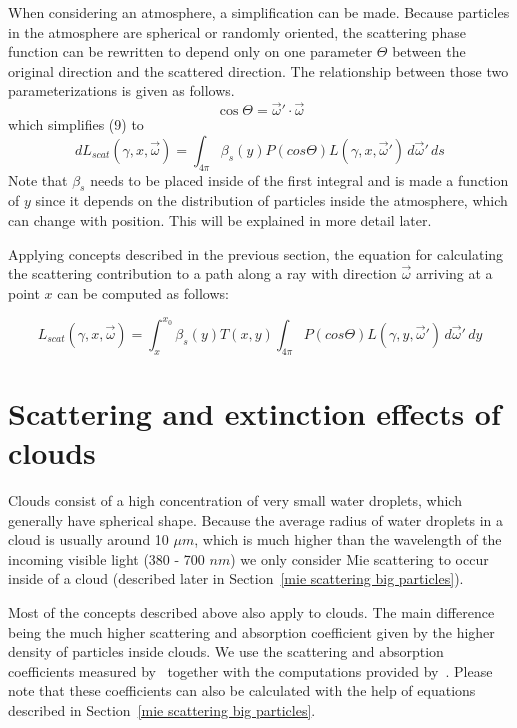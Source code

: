 \documentclass{ctuthesis}
\begin{document}
When considering an atmosphere, a simplification can be made. Because particles in the
atmosphere are spherical or randomly oriented, the scattering phase function can be 
rewritten to depend only on one parameter $\Theta$ between the original direction and the scattered 
direction. The relationship between those two parameterizations is given as follows.
\begin{equation}
    \cos \Theta = \overrightarrow{\omega}' \cdot \overrightarrow{\omega}
\end{equation}
which simplifies (9) to
\begin{equation}
    d L_{scat}(\gamma, x, \overrightarrow{\omega}) = \int_{4 \pi} \beta_{s}(y) P( cos \Theta) 
    L (\gamma, x, \overrightarrow{\omega}') \,d\overrightarrow{\omega}' \,ds
\end{equation}
Note that $\beta_{s}$ needs to be placed inside of the first integral and is made a function of $y$
since it depends on the distribution of particles inside the atmosphere, which can change with 
position. This will be explained in more detail later.

Applying concepts described in the previous section, the equation for calculating the scattering contribution to a path along a ray with direction $\overrightarrow{\omega}$ arriving at a point $x$ can be computed as follows:

\begin{equation}
\label{eq:scattering contribution equation}
    L_{scat}(\gamma, x, \overrightarrow{\omega}) =  
    \int_{x}^{x_{0}} \beta_{s}(y) T(x,y)  \int_{4 \pi} P( cos \Theta)  
    L (\gamma, y, \overrightarrow{\omega}') \,d\overrightarrow{\omega}' \,dy
\end{equation}

\section{Scattering and extinction effects of clouds}
    Clouds consist of a high concentration of very small water droplets, which generally
    have spherical shape. Because the average radius of water droplets in a cloud is usually around 
    10 $\mu m$, which is much higher than the wavelength of the incoming visible light (380 - 700 $nm$)
    we only consider Mie scattering to occur inside of a cloud (described later in Section~\ref{mie scattering big particles}).

    Most of the concepts described above also apply to clouds. The main difference being the much higher
    scattering and absorption coefficient given by the higher density of particles inside clouds. We use the scattering
    and absorption coefficients measured by~\cite{hess1998optical} together with the computations provided 
    by~\cite{kokhanovsky2004optical}. Please note that these coefficients can also be calculated with the help
    of equations described in Section~\ref{mie scattering big particles}.
\end{document}

